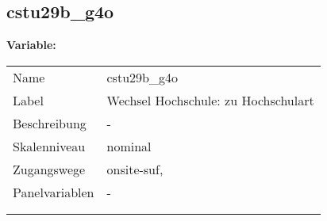 	
	
	\subsection{cstu29b\_g4o}
	\label{subSection:cstu29b_g4o}

	\noindent\textbf{Variable:}\\
		\begin{tabular}{lL{11.3cm}}
			\label{tableVariable:cstu29b_g4o}
			Name & cstu29b\_g4o \\
			Label & Wechsel Hochschule: zu Hochschulart \\
			Beschreibung & - \\
			Skalenniveau & nominal \\
			Zugangswege &
				onsite-suf,
 \\
			Panelvariablen & -
			 \\
			 \\
 \\
		\end{tabular}






